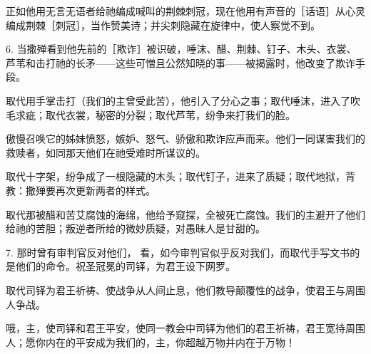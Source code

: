 正如他用无言无语者给祂编成喊叫的荆棘刺冠，现在他用有声音的［话语］从心灵编成荆棘［刺冠］，当作赞美诗；并尖刺隐藏在旋律中，使人察觉不到。\par

6. 当撒殚看到他先前的［欺诈］被识破，唾沫、醋、荆棘、钉子、木头、衣裳、芦苇和击打祂的长矛——这些可憎且公然知晓的事——被揭露时，他改变了欺诈手段。\par

取代用手掌击打（我们的主曾受此苦），他引入了分心之事；取代唾沫，进入了吹毛求疵；取代衣裳，秘密的分裂；取代芦苇，纷争来打我们的脸。\par

傲慢召唤它的姊妹愤怒，嫉妒、怒气、骄傲和欺诈应声而来。他们一同谋害我们的救赎者，如同那天他们在祂受难时所谋议的。\par

取代十字架，纷争成了一根隐藏的木头；取代钉子，进来了质疑；取代地狱，背教：撒殚要再次更新两者的样式。\par

取代那被醋和苦艾腐蚀的海绵，他给予窥探，全被死亡腐蚀。我们的主避开了他们给祂的苦胆；叛逆者所给的微妙质疑，对愚昧人是甘甜的。\par

7. 那时曾有审判官反对他们， 看，如今审判官似乎反对我们，而取代手写文书的是他们的命令。祝圣冠冕的司铎，为君王设下网罗。\par

取代司铎为君王祈祷、使战争从人间止息，他们教导颠覆性的战争，使君王与周围人争战。\par

哦，主，使司铎和君王平安，使同一教会中司铎为他们的君王祈祷，君王宽待周围人；愿你内在的平安成为我们的，主，你超越万物并内在于万物！\par


